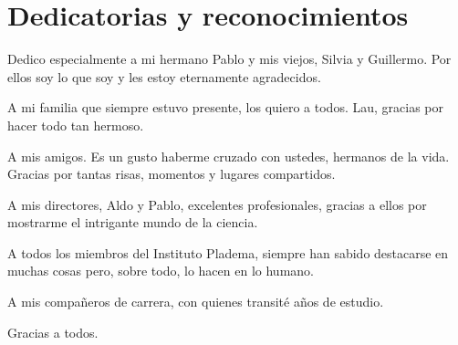 %
%
\chapter*{Dedicatorias y reconocimientos}
\begin{SingleSpace}
Dedico especialmente a mi hermano Pablo y mis viejos, Silvia y Guillermo. Por ellos soy lo que soy y les estoy eternamente agradecidos.
\par 
A mi familia que siempre estuvo presente, los quiero a todos. Lau, gracias por hacer todo tan hermoso.

A mis amigos. Es un gusto haberme cruzado con ustedes, hermanos de la vida. Gracias por tantas risas, momentos y lugares compartidos.

A mis directores, Aldo y Pablo, excelentes profesionales, gracias a ellos por mostrarme el intrigante mundo de la ciencia.

A todos los miembros del Instituto Pladema, siempre han sabido destacarse en muchas cosas pero, sobre todo, lo hacen en lo humano.

A mis compañeros de carrera, con quienes transité años de estudio.

Gracias a todos. 

\end{SingleSpace}
\clearpage